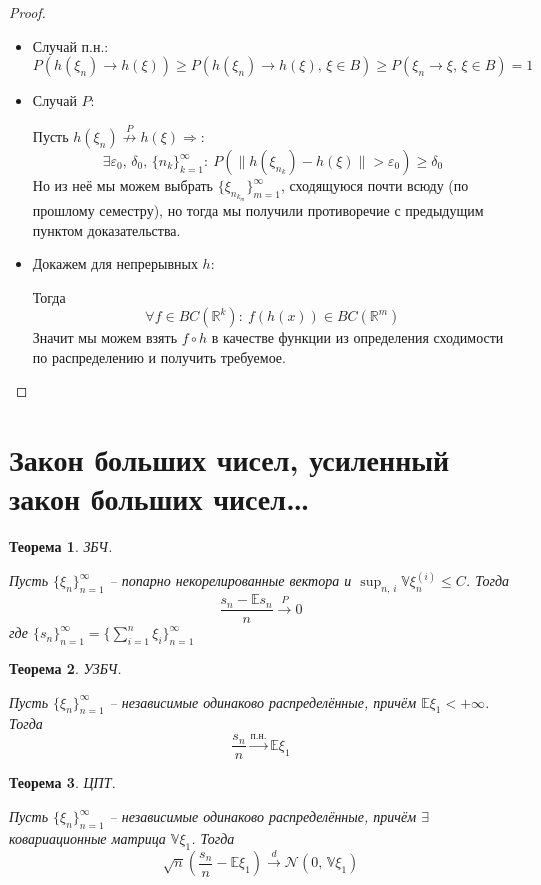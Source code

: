 \documentclass[a4paper,12pt]{article}
\renewcommand{\leq}{\ensuremath{\leqslant}}
\renewcommand{\geq}{\ensuremath{\geqslant}}
\theoremstyle{plain}
\newtheorem{theorem}{Теорема}[section]
\theoremstyle{definition}
\theoremstyle{remark}
\begin{document}
\begin{proof}
  \begin{itemize}
    \item Случай п.н.:
    \[
      P(h(\xi_n) \to h(\xi)) \geq P(h(\xi_n) \to h(\xi),\, \xi \in B) \geq P(\xi_n \to \xi,\, \xi \in B) = 1
    \]
    \item Случай $P$:
    
    Пусть $h(\xi_n) \overset{P}{\not\to} h(\xi) \Rightarrow$:
    \[
      \exists \varepsilon_0,\,\delta_0,\, \{n_k\}_{k = 1}^\infty :\: P(\|h(\xi_{n_k}) - h(\xi)\| > \varepsilon_0) \geq \delta_0
    \]
    Но из неё мы можем выбрать $\{\xi_{n_{k_m}}\}_{m = 1}^\infty$, сходящуюся почти всюду (по прошлому семестру), но тогда мы получили противоречие с предыдущим пунктом доказательства.
    \item Докажем для непрерывных $h$:
    
    Тогда \[
      \forall f \in BC(\mathbb{R}^k) :\: f(h(x)) \in BC(\mathbb{R}^m)
    \]
    Значит мы можем взять $f \circ h$ в качестве функции из определения сходимости по распределению и получить требуемое.
  \end{itemize}
\end{proof}

\section{Закон больших чисел, усиленный закон больших чисел\dots}
\begin{theorem}
  ЗБЧ.

  Пусть $\{\xi_n\}_{n = 1}^\infty$ -- попарно некорелированные вектора и $\sup_{n,\, i} \mathbb{V}\xi_n^{(i)} \leq C$. Тогда
  \[
    \frac{s_n - \mathbb{E}s_n}{n} \overset{P}{\to} 0
  \]
  где $\{s_n\}_{n = 1}^\infty = \{\sum_{i = 1}^n \xi_i\}_{n = 1}^\infty$
\end{theorem}

\begin{theorem}
  УЗБЧ.

  Пусть $\{\xi_n\}_{n = 1}^\infty$ -- независимые одинаково распределённые, причём $\mathbb{E}\xi_1 < +\infty$. Тогда
  \[
    \frac{s_n}{n} \overset{\text{п.н.}}{\to} \mathbb{E}\xi_1
  \]
\end{theorem}

\begin{theorem}
  ЦПТ.

  Пусть $\{\xi_n\}_{n = 1}^\infty$ -- независимые одинаково распределённые, причём $\exists$ ковариационные матрица $\mathbb{V}\xi_1$. Тогда
  \[
    \sqrt{n}\left(\frac{s_n}{n} - \mathbb{E}\xi_1\right) \overset{d}{\to} \mathcal{N}(0,\, \mathbb{V}\xi_1)
  \]
\end{theorem}
\end{document}
